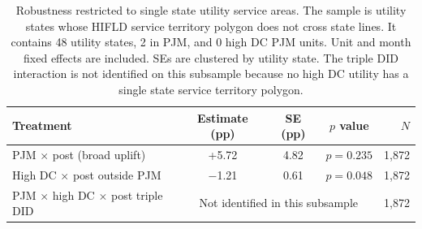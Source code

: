 \begin{table}[H]
\centering
\caption{Robustness restricted to single state utility service areas. The sample is utility states whose HIFLD service territory polygon does not cross state lines. It contains 48 utility states, 2 in PJM, and 0 high DC PJM units. Unit and month fixed effects are included. SEs are clustered by utility state. The triple DID interaction is not identified on this subsample because no high DC utility has a single state service territory polygon.}
\label{tab:single_state}
\small
\setlength{\tabcolsep}{6pt}
\begin{tabular}{l c c c r}
\toprule
Treatment & Estimate (pp) & SE (pp) & $p$ value & $N$ \\
\midrule
PJM \(\times\) post (broad uplift) & +5.72 & 4.82 & $p=0.235$ & 1,872 \\
High DC \(\times\) post outside PJM & $-$1.21 & 0.61 & $p=0.048$ & 1,872 \\
PJM \(\times\) high DC \(\times\) post triple DID & \multicolumn{3}{c}{Not identified in this subsample} & 1,872 \\
\bottomrule
\end{tabular}
\end{table}
